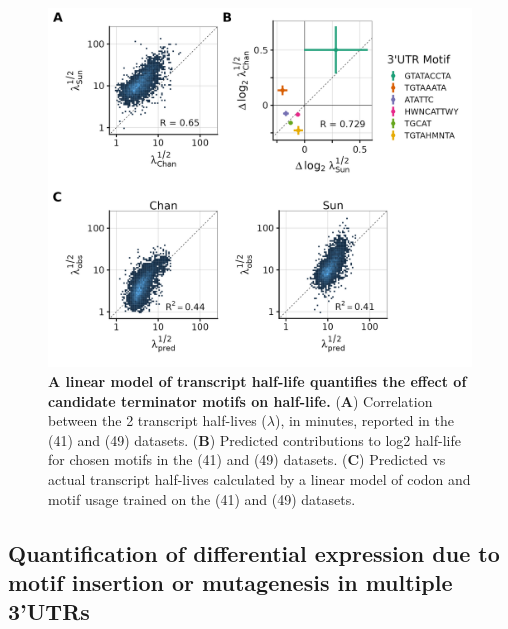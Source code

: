 \documentclass{SBCbookchapter}
\begin{document}
\begin{figure}[p]

{\centering \includegraphics[width=0.98\linewidth]{figures/hlife_model_multi_fig} 

}

\caption{\textbf{A linear model of transcript half-life quantifies the effect of candidate terminator motifs on half-life.} (\textbf{A}) Correlation between the 2 transcript half-lives (\(\lambda\)), in minutes, reported in the (41) and (49) datasets. (\textbf{B}) Predicted contributions to log2 half-life for chosen motifs in the (41) and (49) datasets. (\textbf{C}) Predicted vs actual transcript half-lives calculated by a linear model of codon and motif usage trained on the (41) and (49) datasets.}\label{fig:hlife-decay-model}
\end{figure}

\subsection{Quantification of differential expression due to motif insertion or mutagenesis in multiple 3'UTRs}
\end{document}
